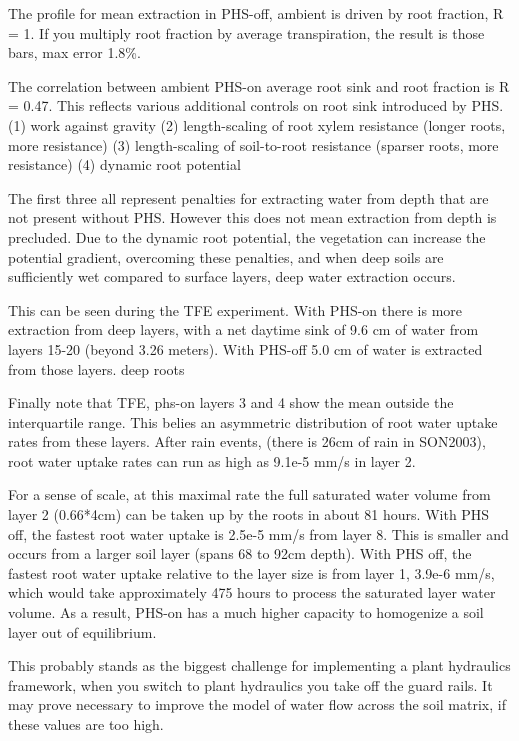 \documentclass[draft,linenumbers]{agujournal}
\begin{document}
The profile for mean extraction in PHS-off, ambient is driven by root fraction, R = 1.
If you multiply root fraction by average transpiration, the result is those bars, max error 1.8\%.

The correlation between ambient PHS-on average root sink and root fraction is R = 0.47.
This reflects various additional controls on root sink introduced by PHS.
(1) work against gravity
(2) length-scaling of root xylem resistance (longer roots, more resistance)
(3) length-scaling of soil-to-root resistance (sparser roots, more resistance)
(4) dynamic root potential

The first three all represent penalties for extracting water from depth that are not present without PHS.
However this does not mean extraction from depth is precluded.
Due to the dynamic root potential, the vegetation can increase the potential gradient, overcoming these penalties,  
and when deep soils are sufficiently wet compared to surface layers, deep water extraction occurs.

This can be seen during the TFE experiment. With PHS-on there is more extraction from deep layers, 
with a net daytime sink of 9.6 cm of water from layers 15-20 (beyond 3.26 meters). 
With PHS-off  5.0 cm of water is extracted from those layers.
deep roots \citep{nepstad1994}

Finally note that TFE, phs-on layers 3 and 4 show the mean outside the interquartile range. 
This belies an asymmetric distribution of root water uptake rates from these layers.
After rain events, (there is 26cm of rain in SON2003), root water uptake rates can run as high as 9.1e-5 mm/s in layer 2.

For a sense of scale, at this maximal rate the full saturated water volume from layer 2 (0.66*4cm) can be taken up by the roots in about 81 hours.
With PHS off, the fastest root water uptake is 2.5e-5 mm/s from layer 8. This is smaller and occurs from a larger soil layer (spans 68 to 92cm depth).
With PHS off, the fastest root water uptake relative to the layer size is from layer 1, 3.9e-6 mm/s, 
which would take approximately 475 hours to process the saturated layer water volume. 
As a result, PHS-on has a much higher capacity to homogenize a soil layer out of equilibrium. 

This probably stands as the biggest challenge for implementing a plant hydraulics framework, 
when you switch to plant hydraulics you take off the guard rails. 
It may prove necessary to improve the model of water flow across the soil matrix, if these values are too high.
\end{document}

